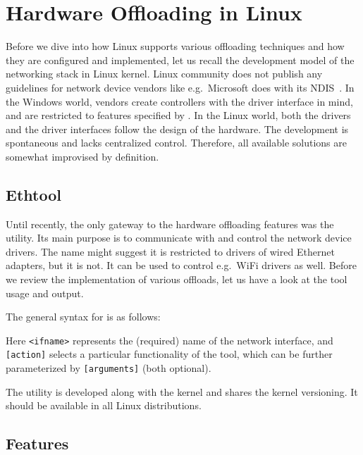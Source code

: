 \chapter{Hardware Offloading in Linux}
\label{chap:linux}

Before we dive into how Linux supports various offloading techniques and how they
are configured and implemented, let us recall the development
model of the networking stack in Linux kernel. Linux
community does not publish any guidelines for network device vendors like
e.g.\ Microsoft does with its \acrfull{NDIS}~\cite{NDIS}. In the Windows world,
vendors create controllers with the driver interface in mind, and are
restricted to features specified by . In the Linux world, both the
drivers and the driver interfaces follow the design of the hardware. The
development is spontaneous and lacks centralized control. Therefore, all available
solutions are somewhat improvised by definition.

\section{Ethtool}

Until recently, the only gateway to the hardware offloading features was the
 utility. Its main purpose is to communicate with and
control the network device drivers. The name might suggest it is restricted to
drivers of wired Ethernet adapters, but it is not. It can be used to control e.g.\ WiFi
drivers as well. Before we review the implementation of various offloads, let
us have a look at the tool usage and output.

The general syntax for  is as follows:


Here \texttt{<ifname>} represents the (required) name of the network
interface, and \texttt{[action]} selects a particular functionality of the
tool, which can be further parameterized by \texttt{[arguments]} (both
optional).

The utility is developed along with the kernel and shares the kernel
versioning. It should be available in all Linux distributions.

\section{Features}

